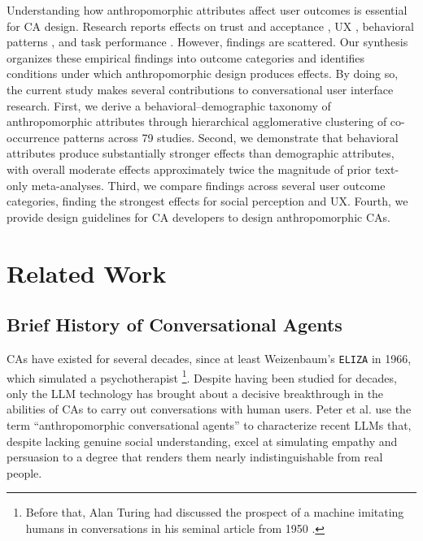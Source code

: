 \documentclass[manuscript,screen,review,anonymous]{acmart}
\DeclareRobustCommand{\change}[1]{%
    \textcolor{changeblue}{#1}%
  }
\DeclareRobustCommand{\change}[1]{#1}
\begin{document}
Understanding how anthropomorphic attributes affect user outcomes is essential for CA design. Research reports effects on trust and acceptance \citep{kraus_role_2021,chandra_be_2022}, UX \citep{lieb_student_2024,liu_older_2023}, behavioral patterns \citep{mehra_chatbot_2021,chen_you_2021}, and task performance \citep{zheldibayeva_genai_2025,baihaqi_rapport-driven_2024}. However, findings are scattered. Our synthesis organizes these empirical findings into outcome categories and identifies conditions under which anthropomorphic design produces effects.
By doing so, the current study makes several contributions to conversational user interface research. \change{First, we  derive a behavioral–demographic taxonomy of anthropomorphic attributes through hierarchical agglomerative clustering of co-occurrence patterns across 79 studies.} Second, we demonstrate that behavioral attributes produce substantially stronger effects than demographic attributes, with overall moderate effects approximately twice the magnitude of prior text-only meta-analyses. Third, we compare findings across several user outcome categories, finding the strongest effects for social perception and UX. Fourth, we provide design guidelines for CA developers to design anthropomorphic CAs.

\section{Related Work}

\subsection{Brief History of Conversational Agents}
CAs have existed for several decades, since at least Weizenbaum's \texttt{ELIZA} in 1966, which simulated a psychotherapist \citep{weizenbaum_elizacomputer_1966}\footnote{Before that, Alan Turing had discussed the prospect of a machine imitating humans in conversations in his seminal article from 1950 \citep{turing_computing_1950}.}. Despite having been studied for decades, only the LLM technology has brought about a decisive breakthrough in the abilities of CAs to carry out conversations with human users. Peter et al. \cite{peter_benefits_2025} use the term ``anthropomorphic conversational agents'' to characterize recent LLMs that, despite lacking genuine social understanding, excel at simulating empathy and persuasion to a degree that renders them nearly indistinguishable from real people. %
\end{document}

